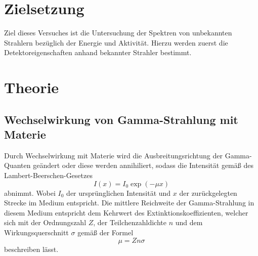 



\maketitle

\section{Zielsetzung}
Ziel dieses Versuches ist die Untersuchung der Spektren von unbekannten Strahlern bezüglich der Energie und Aktivität.
Hierzu werden zuerst die Detektoreigenschaften anhand bekannter Strahler bestimmt. 

\section{Theorie}
\subsection{Wechselwirkung von Gamma-Strahlung mit Materie}
Durch Wechselwirkung mit Materie wird die Ausbreitungsrichtung der Gamma-Quanten geändert oder diese werden annihiliert, sodass die Intensität gemäß des Lambert-Beerschen-Gesetzes
\begin{equation}
I(x) = I_0 \exp(-\mu x)
\end{equation}
abnimmt.
Wobei $I_0$ der ursprünglichen Intensität und $x$ der zurückgelegten Strecke im Medium entspricht.
Die mittlere Reichweite der Gamma-Strahlung in diesem Medium entspricht dem Kehrwert des Extinktionskoeffizienten, welcher sich mit der Ordnungszahl $Z$, der Teilchenzahldichte $n$ und dem Wirkungsquerschnitt $\sigma$ gemäß der Formel
\begin{equation}\label{eq:mu}
\mu = Zn\sigma
\end{equation}
beschreiben lässt.

